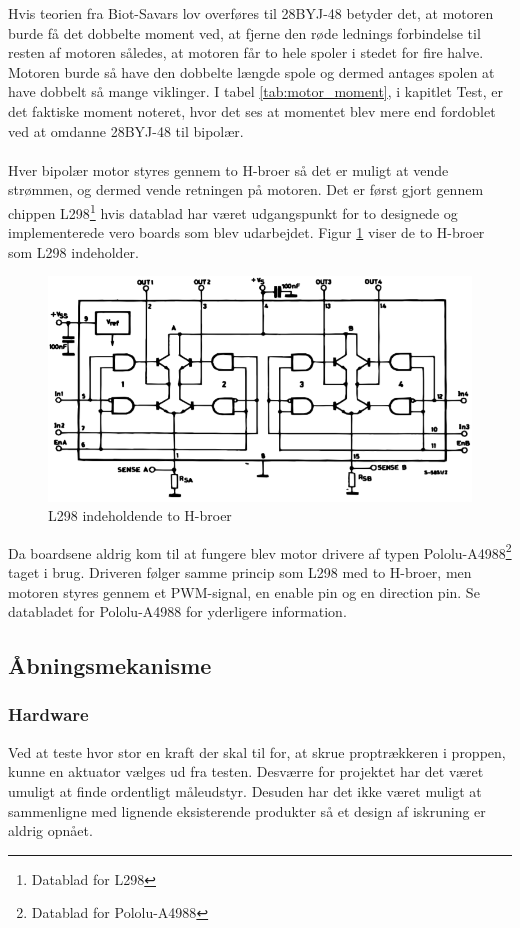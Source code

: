 \noindent
Hvis teorien fra Biot-Savars lov overføres til 28BYJ-48 betyder det, at motoren burde få det dobbelte moment ved, at fjerne den røde lednings forbindelse til resten af motoren således, at motoren får to hele spoler i stedet for fire halve. Motoren burde så have den dobbelte længde spole og dermed antages spolen at have dobbelt så mange viklinger. I tabel \ref{tab:motor_moment}, i kapitlet Test, er det faktiske moment noteret, hvor det ses at momentet blev mere end fordoblet ved at omdanne 28BYJ-48 til bipolær.
\\
\\
Hver bipolær motor styres gennem to H-broer så det er muligt at vende strømmen, og dermed vende retningen på motoren. Det er først gjort gennem chippen L298\footnote{Datablad for L298} hvis datablad har været udgangspunkt for to designede og implementerede vero boards som blev udarbejdet. Figur \ref{fig:L298} viser de to H-broer som L298 indeholder.

\begin{figure}[H]
	\centerline{\includegraphics[scale=0.33]{tex/Design/L298}}
	\caption{L298 indeholdende to H-broer}
	\label{fig:L298}
\end{figure}

\noindent
Da boardsene aldrig kom til at fungere blev motor drivere af typen Pololu-A4988\footnote{Datablad for Pololu-A4988} taget i brug. Driveren følger samme princip som L298 med to H-broer, men motoren styres gennem et PWM-signal, en enable pin og en direction pin. Se databladet for Pololu-A4988 for yderligere information.

\subsection{Åbningsmekanisme}
\subsubsection{Hardware}
Ved at teste hvor stor en kraft der skal til for, at skrue proptrækkeren i proppen, kunne en aktuator vælges ud fra testen. Desværre for projektet har det været umuligt at finde ordentligt måleudstyr. Desuden har det ikke været muligt at sammenligne med lignende eksisterende produkter så et design af iskruning er aldrig opnået.

